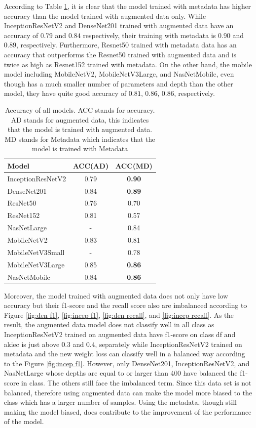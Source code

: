 \documentclass[sensors,article,submit,pdftex,moreauthors]{Definitions/mdpi}
\begin{document}
	According to Table \ref{table:overall-acc}, it is clear that the model trained with metadata has higher accuracy than the model trained with augmented data only. While InceptionResNetV2 and DenseNet201 trained with augmented data have an accuracy of $0.79$ and $0.84$ respectively, their training with metadata is $0.90$ and $0.89$, respectively. Furthermore, Resnet50 trained with metadata data has an accuracy that outperforms the Resnet50 trained with augmented data and is twice as high as Resnet152 trained with metadata. On the other hand, the mobile model including MobileNetV2, MobileNetV3Large, and NasNetMobile, even though has a much smaller number of parameters and depth than the other model, they have quite good accuracy of $0.81$, $0.86$, $0.86$, respectively. 
	
	\begin{table}[H]
		\centering
		\begin{tabular}{| l | c  c | }
			\hline
			Model & ACC(AD) & ACC(MD)\\ 
			\hline
			InceptionResNetV2 & 0.79 & \textbf{0.90}\\
			\hline
			DenseNet201 & 0.84 & \textbf{0.89}\\
			\hline
			ResNet50 & 0.76 & 0.70\\
			\hline
			ResNet152 & 0.81 & 0.57\\
			\hline
			NasNetLarge & - & 0.84\\
			\hline
			MobileNetV2 & 0.83 & 0.81\\
			\hline
			MobileNetV3Small & - & 0.78\\
			\hline
			MobileNetV3Large & 0.85 & \textbf{0.86}\\
			\hline
			NasNetMobile & 0.84 & \textbf{0.86}\\
			\hline
		\end{tabular}
		\caption{Accuracy of all models. ACC stands for accuracy. AD stands for augmented data, this indicates that the model is trained with augmented data. MD stands for Metadata which indicates that the model is trained with Metadata}
		\label{table:overall-acc}
	\end{table}
	
	Moreover, the model trained with augmented data does not only have low accuracy but their f1-score and the recall score also are imbalanced according to Figure \ref{fig:den f1}, \ref{fig:incep f1}, \ref{fig:den recall}, and \ref{fig:incep recall}. As the result, the augmented data model does not classify well in all class as InceptionResNetV2 trained on augmented data have f1-score on class df and akiec is just above $0.3$ and $0.4$, separately while InceptionResNetV2 trained on metadata and the new weight loss can classify well in a balanced way according to the Figure \ref{fig:incep f1}. However, only DenseNet201, InceptionResNetV2, and NasNetLarge whose depths are equal to or larger than 400 have balanced the f1-score in class. The others still face the imbalanced term. Since this data set is not balanced, therefore using augmented data can make the model more biased to the class which has a larger number of samples. Using the metadata, though still making the model biased, does contribute to the improvement of the performance of the model.
	
\end{document}
